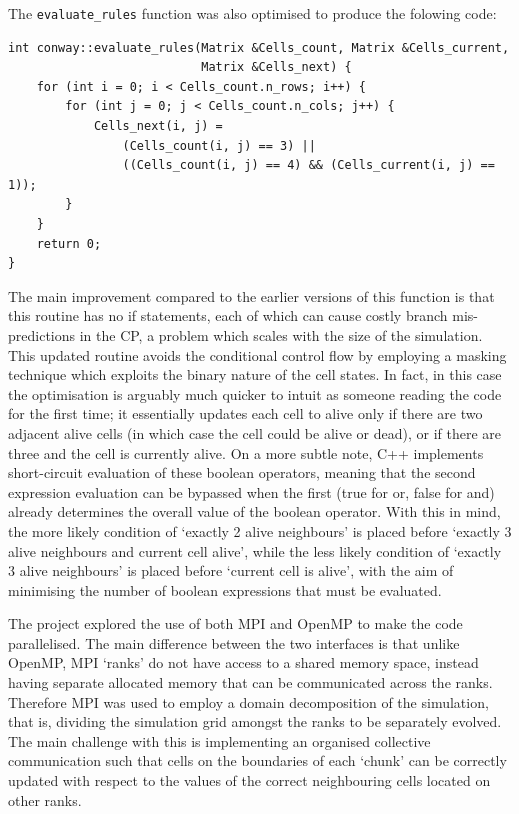 \documentclass[12pt]{article}
\begin{document}
The \texttt{evaluate\_rules} function was also optimised to produce the folowing code:

\begin{lstlisting}
int conway::evaluate_rules(Matrix &Cells_count, Matrix &Cells_current,
                           Matrix &Cells_next) {
    for (int i = 0; i < Cells_count.n_rows; i++) {
        for (int j = 0; j < Cells_count.n_cols; j++) {
            Cells_next(i, j) =
                (Cells_count(i, j) == 3) ||
                ((Cells_count(i, j) == 4) && (Cells_current(i, j) == 1));
        }
    }
    return 0;
}
\end{lstlisting}

The main improvement compared to the earlier versions of this function is that this routine has no if statements,
each of which can cause costly branch mis-predictions in the CP, a problem which scales with the size of the simulation.
This updated routine avoids the conditional control flow by employing a masking technique which exploits the binary nature of the cell states.
In fact, in this case the optimisation is arguably much quicker to intuit as someone reading the code for the first time;
it essentially updates each cell to alive only if there are two adjacent alive cells (in which case the cell could be alive or dead),
or if there are three and the cell is currently alive.
On a more subtle note, C++ implements short-circuit evaluation of these boolean operators,
meaning that the second expression evaluation can be bypassed when the first (true for or, false for and)
already determines the overall value of the boolean operator.
With this in mind, the more likely condition of `exactly 2 alive neighbours' is placed before `exactly 3 alive neighbours and current cell alive',
while the less likely condition of `exactly 3 alive neighbours' is placed before `current cell is alive',
with the aim of minimising the number of boolean expressions that must be evaluated.

The project explored the use of both MPI and OpenMP to make the code parallelised.
The main difference between the two interfaces is that unlike OpenMP, MPI `ranks' do not have access to a shared memory space,
instead having separate allocated memory that can be communicated across the ranks.
Therefore MPI was used to employ a domain decomposition of the simulation, that is,
dividing the simulation grid amongst the ranks to be separately evolved.
The main challenge with this is implementing an organised collective communication such that cells on the boundaries of each `chunk'
can be correctly updated with respect to the values of the correct neighbouring cells located on other ranks.
\end{document}
